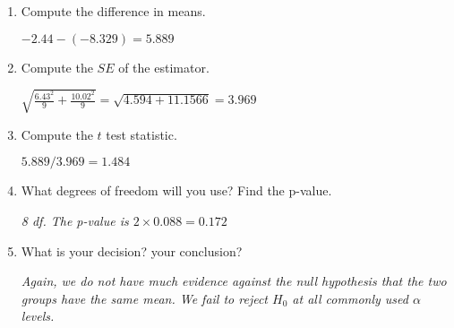 \begin{enumerate}
\begin{enumerate}
      \item Compute the difference in means.
\begin{students}
    \vspace{1cm}    
\end{students}

\begin{key}
  {\it  $ -2.44 -( -8.329) = 5.889$}
\end{key}

      \item Compute the $SE$ of the estimator.
\begin{students}
    \vspace{1cm}    
\end{students}

\begin{key}
  {\it  $ \sqrt{ \frac{6.43^2}{9} + \frac{10.02^2}{9}} = \sqrt{
    4.594 + 11.1566 } = 3.969$ }
\end{key}

      \item Compute the $t$ test statistic.
\begin{students}
    \vspace{1cm}    
\end{students}

\begin{key}
  {\it   $ 5.889 / 3.969 = 1.484$}
\end{key}

      \item What degrees of freedom will you use?  Find the p-value.
\begin{students}
    \vspace{1cm}    
\end{students}

\begin{key}
  {\it  8 df.  The p-value is $2 \times 0.088 = 0.172 $}
\end{key}

      \item What is your decision? your conclusion? 
\begin{students}
    \vspace{2cm}    
\end{students}

\begin{key}
  {\it  Again, we do not have much evidence against the null
    hypothesis that the two groups have the same mean. We fail to
    reject $H_0$ at all commonly used $\alpha$ levels. }
\end{key}


\end{enumerate}
\end{enumerate}
